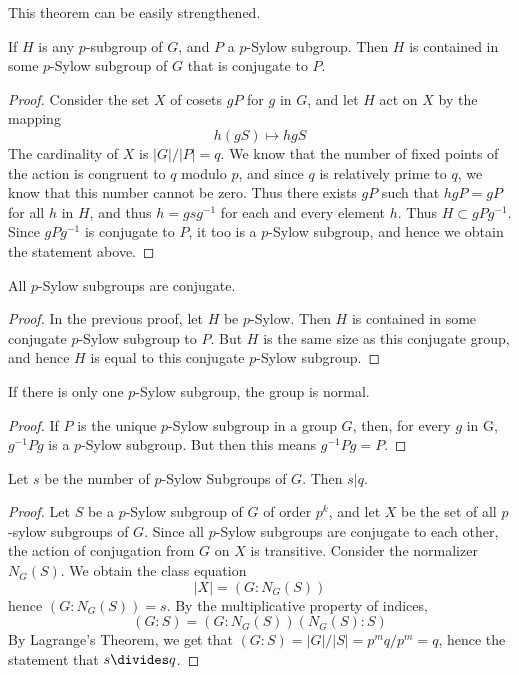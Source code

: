 This theorem can be easily strengthened.

\begin{theorem}
    If $H$ is any $p$-subgroup of $G$, and $P$ a $p$-Sylow subgroup. Then $H$ is contained in some $p$-Sylow subgroup of $G$ that is conjugate to $P$.
\end{theorem}
\begin{proof}
    Consider the set $X$ of cosets $gP$ for $g$ in $G$, and let $H$ act on $X$ by the mapping
    \[ h(gS) \mapsto hgS \]
    The cardinality of $X$ is $|G|/|P| = q$. We know that the number of fixed points of the action is congruent to $q$ modulo $p$, and since $q$ is relatively prime to $q$, we know that this number cannot be zero. Thus there exists $gP$ such that $hgP = gP$ for all $h$ in $H$, and thus $h = gsg^{-1}$ for each and every element $h$. Thus $H \subset gPg^{-1}$. Since $gPg^{-1}$ is conjugate to $P$, it too is a $p$-Sylow subgroup, and hence we obtain the statement above.
\end{proof}

\begin{corollary}
    All $p$-Sylow subgroups are conjugate.
\end{corollary}
\begin{proof}
    In the previous proof, let $H$ be $p$-Sylow. Then $H$ is contained in some conjugate $p$-Sylow subgroup to $P$. But $H$ is the same size as this conjugate group, and hence $H$ is equal to this conjugate $p$-Sylow subgroup.
\end{proof}

\begin{corollary}
    If there is only one $p$-Sylow subgroup, the group is normal.
\end{corollary}
\begin{proof}
    If $P$ is the unique $p$-Sylow subgroup in a group $G$, then, for every $g$ in G, $g^{-1}Pg$ is a $p$-Sylow subgroup. But then this means $g^{-1}Pg = P$.
\end{proof}

\begin{theorem}
    Let $s$ be the number of $p$-Sylow Subgroups of $G$. Then $s | q$.
\end{theorem}
\begin{proof}
    Let $S$ be a $p$-Sylow subgroup of $G$ of order $p^k$, and let $X$ be the set of all $p$-sylow subgroups of $G$. Since all $p$-Sylow subgroups are conjugate to each other, the action of conjugation from $G$ on $X$ is transitive. Consider the normalizer $N_G(S)$. We obtain the class equation
    \[ |X| = (G:N_G(S)) \]
    hence $(G:N_G(S)) = s$. By the multiplicative property of indices,
    \[ (G:S) = (G:N_G(S))(N_G(S):S) \]
    By Lagrange's Theorem, we get that $(G:S) = |G|/|S| = p^mq/p^m = q$, hence the statement that $s \divides q$.
\end{proof}

